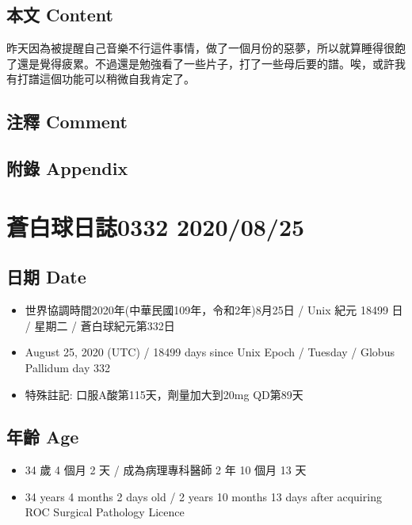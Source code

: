\documentclass[
]{article}
\providecommand{\tightlist}{%
  \setlength{\itemsep}{0pt}\setlength{\parskip}{0pt}}
\begin{document}
\hypertarget{ux672cux6587-content-23}{%
\subsection{本文 Content}\label{ux672cux6587-content-23}}

昨天因為被提醒自己音樂不行這件事情，做了一個月份的惡夢，所以就算睡得很飽了還是覺得疲累。不過還是勉強看了一些片子，打了一些母后要的譜。唉，或許我有打譜這個功能可以稍微自我肯定了。

\hypertarget{ux6ce8ux91cb-comment-23}{%
\subsection{注釋 Comment}\label{ux6ce8ux91cb-comment-23}}

\hypertarget{ux9644ux9304-appendix-23}{%
\subsection{附錄 Appendix}\label{ux9644ux9304-appendix-23}}

\hypertarget{ux84bcux767dux7403ux65e5ux8a8c0332-20200825}{%
\section{蒼白球日誌0332
2020/08/25}\label{ux84bcux767dux7403ux65e5ux8a8c0332-20200825}}

\hypertarget{ux65e5ux671f-date-24}{%
\subsection{日期 Date}\label{ux65e5ux671f-date-24}}

\begin{itemize}
\tightlist
\item
  世界協調時間2020年(中華民國109年，令和2年)8月25日 / Unix 紀元 18499 日
  / 星期二 / 蒼白球紀元第332日
\item
  August 25, 2020 (UTC) / 18499 days since Unix Epoch / Tuesday / Globus
  Pallidum day 332
\item
  特殊註記: 口服A酸第115天，劑量加大到20mg QD第89天
\end{itemize}

\hypertarget{ux5e74ux9f61-age-24}{%
\subsection{年齡 Age}\label{ux5e74ux9f61-age-24}}

\begin{itemize}
\tightlist
\item
  34 歲 4 個月 2 天 / 成為病理專科醫師 2 年 10 個月 13 天
\item
  34 years 4 months 2 days old / 2 years 10 months 13 days after
  acquiring ROC Surgical Pathology Licence
\end{itemize}
\end{document}

